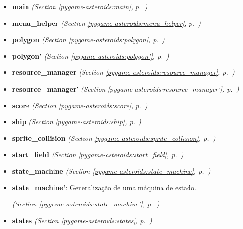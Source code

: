 \begin{itemize}
\item \textbf{main}
  \textit{(Section \ref{pygame-asteroids:main}, p.~\pageref{pygame-asteroids:main})}

\item \textbf{menu\_helper}
  \textit{(Section \ref{pygame-asteroids:menu_helper}, p.~\pageref{pygame-asteroids:menu_helper})}

\item \textbf{polygon}
  \textit{(Section \ref{pygame-asteroids:polygon}, p.~\pageref{pygame-asteroids:polygon})}

\item \textbf{polygon'}
  \textit{(Section \ref{pygame-asteroids:polygon'}, p.~\pageref{pygame-asteroids:polygon'})}

\item \textbf{resource\_manager}
  \textit{(Section \ref{pygame-asteroids:resource_manager}, p.~\pageref{pygame-asteroids:resource_manager})}

\item \textbf{resource\_manager'}
  \textit{(Section \ref{pygame-asteroids:resource_manager'}, p.~\pageref{pygame-asteroids:resource_manager'})}

\item \textbf{score}
  \textit{(Section \ref{pygame-asteroids:score}, p.~\pageref{pygame-asteroids:score})}

\item \textbf{ship}
  \textit{(Section \ref{pygame-asteroids:ship}, p.~\pageref{pygame-asteroids:ship})}

\item \textbf{sprite\_collision}
  \textit{(Section \ref{pygame-asteroids:sprite_collision}, p.~\pageref{pygame-asteroids:sprite_collision})}

\item \textbf{start\_field}
  \textit{(Section \ref{pygame-asteroids:start_field}, p.~\pageref{pygame-asteroids:start_field})}

\item \textbf{state\_machine}
  \textit{(Section \ref{pygame-asteroids:state_machine}, p.~\pageref{pygame-asteroids:state_machine})}

\item \textbf{state\_machine'}: Generalização de uma máquina de estado.



  \textit{(Section \ref{pygame-asteroids:state_machine'}, p.~\pageref{pygame-asteroids:state_machine'})}

\item \textbf{states}
  \textit{(Section \ref{pygame-asteroids:states}, p.~\pageref{pygame-asteroids:states})}


\end{itemize}
